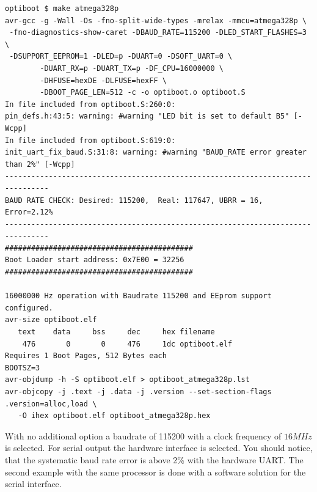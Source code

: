 \begin{verbatim}
optiboot $ make atmega328p
avr-gcc -g -Wall -Os -fno-split-wide-types -mrelax -mmcu=atmega328p \
 -fno-diagnostics-show-caret -DBAUD_RATE=115200 -DLED_START_FLASHES=3 \
 -DSUPPORT_EEPROM=1 -DLED=p -DUART=0 -DSOFT_UART=0 \
        -DUART_RX=p -DUART_TX=p -DF_CPU=16000000 \
        -DHFUSE=hexDE -DLFUSE=hexFF \
        -DBOOT_PAGE_LEN=512 -c -o optiboot.o optiboot.S
In file included from optiboot.S:260:0:
pin_defs.h:43:5: warning: #warning "LED bit is set to default B5" [-Wcpp]
In file included from optiboot.S:619:0:
init_uart_fix_baud.S:31:8: warning: #warning "BAUD_RATE error greater than 2%" [-Wcpp]
--------------------------------------------------------------------------------
BAUD RATE CHECK: Desired: 115200,  Real: 117647, UBRR = 16, Error=2.12%
--------------------------------------------------------------------------------
###########################################
Boot Loader start address: 0x7E00 = 32256
###########################################

16000000 Hz operation with Baudrate 115200 and EEprom support configured.
avr-size optiboot.elf
   text	   data	    bss	    dec	    hex	filename
    476	      0	      0	    476	    1dc	optiboot.elf
Requires 1 Boot Pages, 512 Bytes each
BOOTSZ=3
avr-objdump -h -S optiboot.elf > optiboot_atmega328p.lst
avr-objcopy -j .text -j .data -j .version --set-section-flags .version=alloc,load \
   -O ihex optiboot.elf optiboot_atmega328p.hex
\end{verbatim}


With no additional option a baudrate of 115200 with a clock frequency of \(16 MHz\) is selected.
For serial output the hardware interface is selected.
You should notice, that the systematic baud rate error is above 2\% with the hardware UART.
The second example with the same processor is done with a software solution for the serial interface.

